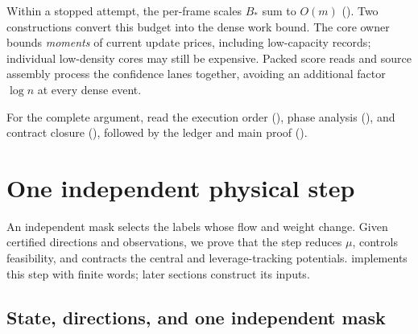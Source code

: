 \documentclass[11pt]{article}
\theoremstyle{remark}
\begin{document}
Within a stopped attempt, the per-frame scales $B_*$ sum to $O(m)$
().
Two constructions convert this budget into the dense work bound.
The core owner bounds \emph{moments} of current update prices, including
low-capacity records; individual low-density cores may still be expensive.
Packed score reads and source assembly process the confidence lanes together,
avoiding an additional factor $\log n$ at every dense event.

For the complete argument, read the execution order (),
phase analysis (), and contract closure
(), followed by the ledger and main proof
().

\section{One independent physical step}
\label{sec:ram-local}

An independent mask selects the labels whose flow and weight change.
Given certified directions and observations, we prove that the step reduces
$\mu$, controls feasibility, and contracts the central and leverage-tracking
potentials.
 implements this step with finite words; later
sections construct its inputs.

\subsection{State, directions, and one independent mask}
\end{document}
